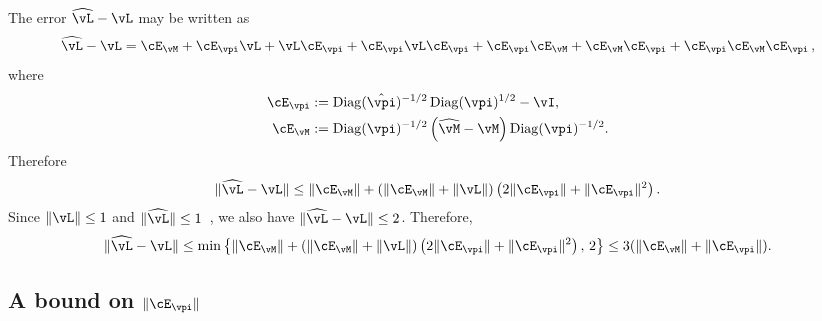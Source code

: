 The error $\wh\vL - \vL$ may be written as
\[
  \wh\vL - \vL
  = \errm + \errp \vL + \vL \errp + \errp \vL \errp
  + \errp \errm + \errm \errp + \errp \errm \errp\,,
\]
where
\begin{align*}
  \errp & := \Diag(\hat\vpi)^{-1/2} \Diag(\vpi)^{1/2} - \vI , \\
  \errm & := \Diag(\vpi)^{-1/2} \Parens{
    \wh\vM - \vM
  } \Diag(\vpi)^{-1/2} .
\end{align*}
Therefore
\begin{align*}
  \norm{\wh\vL - \vL}
  \leq \norm{\errm} +
  \Parens{
    \norm{\errm} + \norm{\vL}
  }
  \Parens{
    2\norm{\errp} + \norm{\errp}^2
  }
  .
\end{align*}
Since $\norm{\vL} \leq 1$ and $\norm{\wh\vL} \leq 1$~\citep[Lemma
12.1]{LePeWi08}, we also have $\norm{\wh\vL - \vL} \leq 2$.
Therefore,
\begin{align}
  \norm{\wh\vL - \vL}
  \leq
  \min\Braces{
    \norm{\errm} +
    \Parens{
      \norm{\errm} + \norm{\vL}
    }
    \Parens{
      2\norm{\errp} + \norm{\errp}^2
    }
    ,\,
    2
  }
  \leq 3(\norm{\errm}+\norm{\errp})
  .
  \label{eq:vlsimple}
\end{align}

%
%
%
\subsection{A bound on $\norm{\errp}$}

